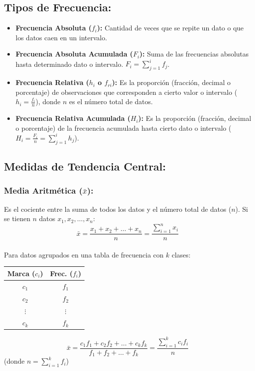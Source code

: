 \documentclass[12pt, letterpaper]{article}
\begin{document}
\subsection{Tipos de Frecuencia:}
\begin{itemize}
	\item \textbf{Frecuencia Absoluta ($f_i$):} Cantidad de veces que se repite un dato o que los datos caen en un intervalo.
	\item \textbf{Frecuencia Absoluta Acumulada ($F_i$):} Suma de las frecuencias absolutas hasta determinado dato o intervalo. $F_i = \sum_{j=1}^{i} f_j$.
	\item \textbf{Frecuencia Relativa ($h_i$ o $f_{ri}$):} Es la proporción (fracción, decimal o porcentaje) de observaciones que corresponden a cierto valor o intervalo ($h_i = \frac{f_i}{n}$), donde $n$ es el número total de datos.
	\item \textbf{Frecuencia Relativa Acumulada ($H_i$):} Es la proporción (fracción, decimal o porcentaje) de la frecuencia acumulada hasta cierto dato o intervalo ($H_i = \frac{F_i}{n} = \sum_{j=1}^{i} h_j$).
\end{itemize}
\newpage

\subsection{Medidas de Tendencia Central:}

\subsubsection{\texorpdfstring{Media Aritmética ($\bar{x}$):}{Media Aritmética (x barra)}}
Es el cociente entre la suma de todos los datos y el número total de datos ($n$). Si se tienen $n$ datos $x_1, x_2, \dots, x_n$:
\[ \bar{x}=\frac{x_1+x_2+\dots+x_n}{n} = \frac{\sum_{i=1}^{n} x_i}{n} \] \\
Para datos agrupados en una tabla de frecuencia con $k$ clases:
\begin{center}
	\begin{minipage}{0.35\textwidth}
		\centering
		\begin{tabular}{|c|c|}
			\hline
			\textbf{Marca ($c_i$)} & \textbf{Frec. ($f_i$)} \\
			\hline
			$c_1$ & $f_1$ \\ \hline
			$c_2$ & $f_2$ \\ \hline
			$\vdots$ & $\vdots$ \\ \hline
			$c_k$ & $f_k$ \\
			\hline
		 \end{tabular}
	\end{minipage}
	\hfill
	\begin{minipage}{0.55\textwidth}
		\centering
		\[ \bar{x}=\frac{c_1 f_1 + c_2 f_2 + \dots + c_k f_k}{f_1+f_2+\dots+f_k} = \frac{\sum_{i=1}^{k} c_i f_i}{n} \]
		(donde $n = \sum_{i=1}^{k} f_i$)
	\end{minipage}
\end{center}
\end{document}
